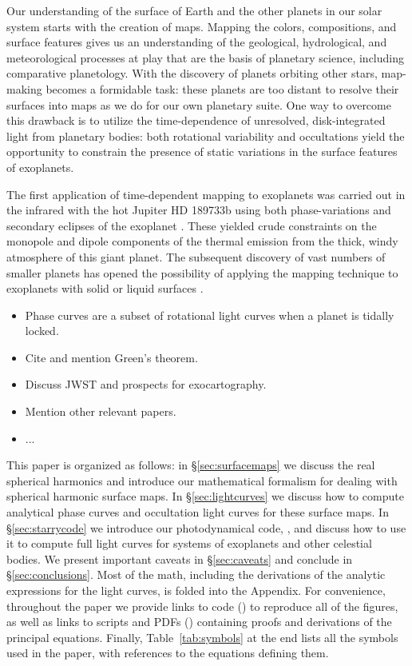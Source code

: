 \documentclass[modern]{aastex61}
\begin{document}
Our understanding of the surface of Earth and the other planets in our solar
system starts with the creation of maps.  Mapping the colors, compositions, and
surface features gives us an understanding of the geological, hydrological,
and meteorological processes at play that are the basis of planetary science,
including comparative planetology.
%
With the discovery of planets orbiting other
stars, map-making becomes a formidable task: these planets are too distant to
resolve their surfaces into maps as we do for our own planetary suite.  One way
to overcome this drawback is to utilize the time-dependence of unresolved,
disk-integrated light from planetary bodies:  both rotational variability and
occultations yield the opportunity to constrain the presence of static variations
in the surface features of exoplanets.

The first application of time-dependent mapping to exoplanets was carried out in the
infrared with the hot Jupiter HD 189733b using both phase-variations and
secondary eclipses of the exoplanet \citep{Knutson2007,Majeau2012,deWit2012}.
These yielded crude constraints on the monopole and dipole components of the thermal
emission from the thick, windy atmosphere of this giant planet. The subsequent
discovery of vast numbers of smaller planets has
opened the possibility of applying the mapping technique to exoplanets with
solid or liquid surfaces
\citep[e.g.,][]{Cowan2012,CowanFuentesHaggard2013,CowanFujii2017,Fujii2017,LugerLustigYaegerAgol2017}.

%
%
%
\noindent
\begin{itemize}
    \item Phase curves are a subset of rotational light curves
          when a planet is tidally locked.
    \item Cite \citet{Pal2012} and mention Green's theorem.
    \item Discuss JWST and prospects for exocartography.
    \item Mention other relevant papers.
    \item ...
\end{itemize}
%
%
%

This paper is organized as follows: in \S\ref{sec:surfacemaps} we discuss the
real spherical harmonics and introduce our mathematical formalism for
dealing with spherical harmonic surface maps. In \S\ref{sec:lightcurves} we
discuss how to compute analytical phase curves and occultation light curves
for these surface maps. In \S\ref{sec:starrycode} we introduce our
photodynamical code, \starry, and discuss how to use it to compute full
light curves for systems of exoplanets and other celestial bodies. We
present important caveats in \S\ref{sec:caveats} and conclude in \S\ref{sec:conclusions}.
Most of the math, including the derivations of the analytic expressions for the
light curves, is folded into the Appendix. For convenience, throughout
the paper we provide links
to \Python code (\pythonlogo{}) to reproduce all of the
figures, as well as links to \Mathematica \citep{Mathematica}
scripts and PDFs (\penlogo{}) containing proofs and derivations
of the principal
equations. Finally, Table~\ref{tab:symbols} at the end lists
all the symbols used
in the paper, with references to the equations defining them.
\end{document}
